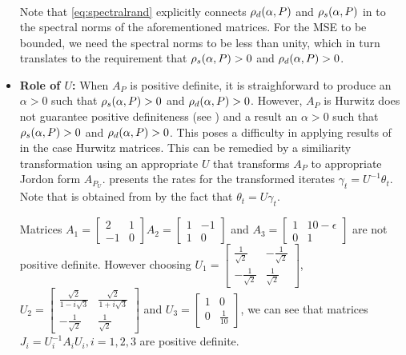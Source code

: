 \begin{itemize}[leftmargin=*, before = \leavevmode\vspace{-\baselineskip}]
\begin{align}
\end{align}
Note that \eqref{eq:spectralrand} explicitly connects $\rho_d(\alpha,P)$ and $\rho_s(\alpha,P)$ in  to the spectral norms of the aforementioned matrices. For the MSE to be bounded, we need the spectral norms to be less than unity, which in turn translates to the requirement that $\rho_s(\alpha,P)>0$ and $\rho_d(\alpha,P)>0$.
\item \textbf{Role of $U$:} When $A_P$ is positive definite, it is straighforward to produce an $\alpha>0$ such that $\rho_s(\alpha,P)>0$ and $\rho_d(\alpha,P)>0$. However, $A_P$ is Hurwitz does not guarantee positive definiteness (see ) and a result an $\alpha>0$ such that $\rho_s(\alpha,P)>0$ and $\rho_d(\alpha,P)>0$. This poses a difficulty in applying results of  in the case Hurwitz matrices. This can be remedied by a similiarity transformation using an appropriate $U$ that transforms $A_P$ to appropriate Jordon form $A_{P_U}$.  presents the rates for the transformed iterates   $\gamma_t=U^{-1 }\theta_t$. Note that  is obtained from  by the fact that $\theta_t=U\gamma_t$.
\begin{example}\label{ex:pdas}
Matrices $A_1=\begin{bmatrix} 2 &1 \\-1 &0\end{bmatrix}$$A_2=\begin{bmatrix}1 & -1\\ 1 &0 \end{bmatrix}$ and $A_3=\begin{bmatrix} 1 & 10-\epsilon \\ 0 &1 \end{bmatrix}$ are not positive definite. However choosing $U_1=\begin{bmatrix} \frac{1}{\sqrt{2}}& -\frac{1}{\sqrt{2}}\\ -\frac{1}{\sqrt{2}} &\frac{1}{\sqrt{2}} \end{bmatrix}$, $U_2=\begin{bmatrix} \frac{\sqrt{2}}{1-i\sqrt{3}} & \frac{\sqrt{2}}{1+i\sqrt{3}} \\ -\frac{1}{\sqrt{2}} &\frac{1}{\sqrt{2}}\end{bmatrix}$ and $U_3=\begin{bmatrix} 1 & 0\\ 0 &\frac{1}{10} \end{bmatrix}$, we can see that matrices $J_i=U_i^{-1}A_i U_i,i=1,2,3$ are positive definite.
\end{example}

\end{itemize}

